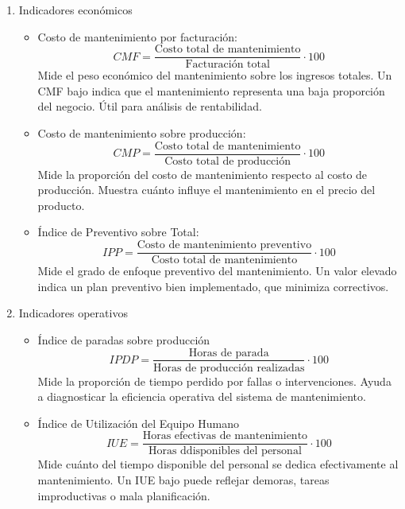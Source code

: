 \documentclass[a4paper,oneside,11pt]{article}
\begin{document}
\begin{enumerate}
    \item Indicadores económicos
    \begin{itemize}
        \item Costo de mantenimiento por facturación:
        \begin{equation*}
            CMF = \dfrac{\text{Costo total de mantenimiento}}{\text{Facturación total}} \cdot 100
        \end{equation*}
        Mide el peso económico del mantenimiento sobre los ingresos totales. Un CMF bajo indica que el mantenimiento representa una baja proporción del negocio. Útil para análisis de rentabilidad.

        \item Costo de mantenimiento sobre producción:
        \begin{equation*}
            CMP = \dfrac{\text{Costo total de mantenimiento}}{\text{Costo total de producción}} \cdot 100
        \end{equation*}
        Mide la proporción del costo de mantenimiento respecto al costo de producción. Muestra cuánto influye el mantenimiento en el precio del producto.

        \item Índice de Preventivo sobre Total:
        \begin{equation*}
            IPP = \dfrac{\text{Costo de mantenimiento preventivo}}{\text{Costo total de mantenimiento}} \cdot 100
        \end{equation*}
        Mide el grado de enfoque preventivo del mantenimiento. Un valor elevado indica un plan preventivo bien implementado, que minimiza correctivos.
    \end{itemize}

    \item Indicadores operativos
    \begin{itemize}
        \item Índice de paradas sobre producción
        \begin{equation*}
            IPDP=\dfrac{\text{Horas de parada}}{\text{Horas de producción realizadas}} \cdot 100
        \end{equation*}
        Mide la proporción de tiempo perdido por fallas o intervenciones. Ayuda a diagnosticar la eficiencia operativa del sistema de mantenimiento.
        
        \item Índice de Utilización del Equipo Humano
        \begin{equation*}
            IUE=\dfrac{\text{Horas efectivas de mantenimiento}}{\text{Horas ddisponibles del personal}} \cdot 100
        \end{equation*}
        Mide cuánto del tiempo disponible del personal se dedica efectivamente al mantenimiento. Un IUE bajo puede reflejar demoras, tareas improductivas o mala planificación.
    \end{itemize}


\end{enumerate}
\end{document}
